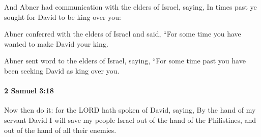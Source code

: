 			\begin{versebox}
					\item[BHS] 
					\item[ASV] And Abner had communication with the elders of Israel, saying, In times past ye sought for David to be king over you:
					\item[NIV] Abner conferred with the elders of Israel and said, “For some time you have wanted to make David your king.
					\item[NRSV] Abner sent word to the elders of Israel, saying, “For some time past you have been seeking David as king over you.
			\end{versebox}

		\paragraph{2 Samuel 3:18} %
			\label{2SAMUEL-3-18}

			Now then do it: for the LORD hath spoken of David, saying, By the hand of my servant David I will save my people Israel out of the hand of the Philistines, and out of the hand of all their enemies.

